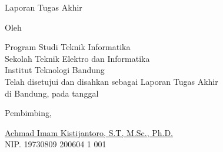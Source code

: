 \clearpage
\pagestyle{empty}

\begin{center}
  \smallskip
  
  \Large \bfseries \MakeUppercase{\thetitle}
  \vfill
  
  \Large Laporan Tugas Akhir
  \vfill
  
  \large Oleh
  
  \Large \theauthor
  
  \large Program Studi Teknik Informatika \\
  
  \normalsize \normalfont
  Sekolah Teknik Elektro dan Informatika \\
  Institut Teknologi Bandung \\
  
  \vfill
  \normalsize \normalfont
  Telah disetujui dan disahkan sebagai Laporan Tugas Akhir \\
  di Bandung, pada tanggal \tanggalpengesahan
  
  \vspace{0.5cm}
  Pembimbing,
  
  \vfill
  \underline{Achmad Imam Kistijantoro, S.T, M.Sc., Ph.D.
  } \\
  NIP. 19730809 200604 1 001
  
\end{center}
\clearpage
